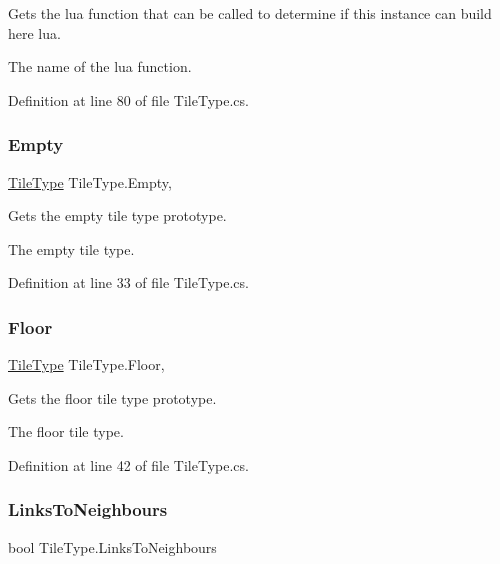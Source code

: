Gets the lua function that can be called to determine if this instance can build here lua. 

The name of the lua function.

Definition at line 80 of file Tile\+Type.\+cs.

\mbox{\label{class_tile_type_a60e6955dc3faf61db0a2fa8426499b92}} 
\subsubsection{\texorpdfstring{Empty}{Empty}}
{\footnotesize\ttfamily \hyperlink{class_tile_type}{Tile\+Type} Tile\+Type.\+Empty\hspace{0.3cm}{\ttfamily [static]}, {\ttfamily [get]}}



Gets the empty tile type prototype. 

The empty tile type.

Definition at line 33 of file Tile\+Type.\+cs.

\mbox{\label{class_tile_type_a340e5076e637c0ef7ff1b11ac4cf04fd}} 
\subsubsection{\texorpdfstring{Floor}{Floor}}
{\footnotesize\ttfamily \hyperlink{class_tile_type}{Tile\+Type} Tile\+Type.\+Floor\hspace{0.3cm}{\ttfamily [static]}, {\ttfamily [get]}}



Gets the floor tile type prototype. 

The floor tile type.

Definition at line 42 of file Tile\+Type.\+cs.

\mbox{\label{class_tile_type_af93d2a77c5ac943fe763b8e0dfed6360}} 
\subsubsection{\texorpdfstring{Links\+To\+Neighbours}{LinksToNeighbours}}
{\footnotesize\ttfamily bool Tile\+Type.\+Links\+To\+Neighbours\hspace{0.3cm}{\ttfamily [get]}}



